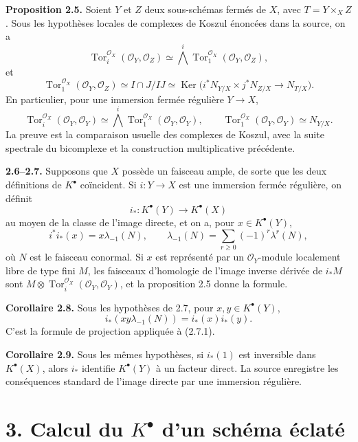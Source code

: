\documentclass[11pt]{article}
\newcommand{\Tor}{\operatorname{Tor}}
\providecommand{\Tor}{\operatorname{Tor}}
\providecommand{\Ker}{\operatorname{Ker}}
\providecommand{\cO}{\mathcal O}
\begin{document}
\textbf{Proposition 2.5.} Soient \(Y\) et \(Z\) deux sous-schémas fermés de \(X\), avec \(T=Y\times_XZ\). Sous les hypothèses locales de complexes de Koszul énoncées dans la source, on a
\begin{equation}\tag{2.5.1}
\Tor_i^{\cO_X}(\cO_Y,\cO_Z)\simeq \bigwedge^i\Tor_1^{\cO_X}(\cO_Y,\cO_Z),
\end{equation}
et
\begin{equation}\tag{2.5.2}
\Tor_1^{\cO_X}(\cO_Y,\cO_Z)
\simeq I\cap J/IJ
\simeq \Ker\bigl(i^*N_{Y/X}\times j^*N_{Z/X}\to N_{T/X}\bigr).
\end{equation}
En particulier, pour une immersion fermée régulière \(Y\to X\),
\begin{equation}\tag{2.5.3}
\Tor_i^{\cO_X}(\cO_Y,\cO_Y)\simeq
\bigwedge^i\Tor_1^{\cO_X}(\cO_Y,\cO_Y),
\qquad
\Tor_1^{\cO_X}(\cO_Y,\cO_Y)\simeq N_{Y/X}.
\end{equation}
La preuve est la comparaison usuelle des complexes de Koszul, avec la suite spectrale du bicomplexe et la construction multiplicative précédente.

\textbf{2.6--2.7.} Supposons que \(X\) possède un faisceau ample, de sorte que les deux définitions de \(K^\bullet\) coïncident. Si \(i:Y\to X\) est une immersion fermée régulière, on définit
\[
i_*:K^\bullet(Y)\to K^\bullet(X)
\]
au moyen de la classe de l'image directe, et on a, pour \(x\in K^\bullet(Y)\),
\begin{equation}\tag{2.7.1}
i^*i_*(x)=x\lambda_{-1}(N),
\qquad
\lambda_{-1}(N)=\sum_{r\ge0}(-1)^r\lambda^r(N),
\end{equation}
où \(N\) est le faisceau conormal. Si \(x\) est représenté par un \(\cO_Y\)-module localement libre de type fini \(M\), les faisceaux d'homologie de l'image inverse dérivée de \(i_*M\) sont \(M\otimes\Tor_i^{\cO_X}(\cO_Y,\cO_Y)\), et la proposition 2.5 donne la formule.

\textbf{Corollaire 2.8.} Sous les hypothèses de 2.7, pour \(x,y\in K^\bullet(Y)\),
\begin{equation}\tag{2.8.1}
i_*(xy\lambda_{-1}(N))=i_*(x)i_*(y).
\end{equation}
C'est la formule de projection appliquée à (2.7.1).

\textbf{Corollaire 2.9.} Sous les mêmes hypothèses, si \(i_*(1)\) est inversible dans \(K^\bullet(X)\), alors \(i_*\) identifie \(K^\bullet(Y)\) à un facteur direct. La source enregistre les conséquences standard de l'image directe par une immersion régulière.

\section*{3. Calcul du \texorpdfstring{$K^\bullet$}{K} d'un schéma éclaté}
\end{document}
